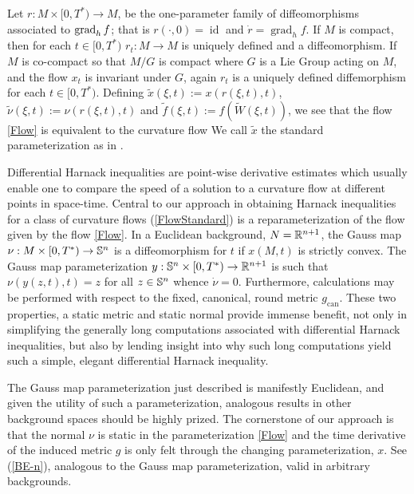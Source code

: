 Let \(r:M\times [0,T^{\ast})\to M\), be the one-parameter family of diffeomorphisms associated to $\grad_h f$; that is $r(\cdot,0)=\operatorname{id}$ and $\dot{r}=\operatorname{grad}_hf$. If $M$ is compact, then for each $t \in [0, T^{\ast})$ $r_t : M \to M$ is uniquely defined and a diffeomorphism. If $M$ is co-compact so that $M/G$ is compact where $G$ is a Lie Group acting on $M$, and the flow $x_t$ is invariant under $G$, again $r_t$ is a uniquely defined diffemorphism for each $t \in [0, T^{\ast})$. Defining $\tilde{x} (\xi, t) := x (r(\xi,t), t)$, $\tilde{\nu} (\xi, t) :=\nu (r(\xi,t), t)$ and $\tilde{f}(\xi,t):=f(\tilde{W} (\xi, t))$, we see that the flow \eqref{Flow} is equivalent to the curvature flow
\eq{\label{FlowStandard}
\tilde{x}&:M\times [0,T^{\ast})\to N\\
\dot{\tilde{x}} &= -\s \tilde{f} \tilde{\nu}.}
We call $\tilde{x}$ the standard parameterization as in \cite{Andrews:09/1994}.

Differential Harnack inequalities are point-wise derivative estimates which usually enable one to compare the speed of a solution to a curvature flow at different points in space-time.
Central to our approach in obtaining Harnack inequalities for a class of curvature flows (\ref{FlowStandard}) is a reparameterization of the flow given by the flow \eqref{Flow}.
In a Euclidean background, $N = \R^{n+1}$, the Gauss map $\nu: M\times [0,T^{\ast}) \to \S^n$ is a diffeomorphism for $t$ if $x(M,t)$ is strictly convex. The Gauss map parameterization $y: \S^n\times [0,T^{\ast}) \to \R^{n+1}$ \cite{Andrews:09/1994} is such that $\nu(y(z,t),t) = z$ for all $z \in \S^n$ whence $\dot{\nu} = 0$. Furthermore, calculations may be performed with respect to the fixed, canonical, round metric $g_{\operatorname{can}}$. These two properties, a static metric and static normal provide immense benefit, not only in simplifying the generally long computations associated with differential Harnack inequalities, but also by lending insight into why such long computations yield such a simple, elegant differential Harnack inequality.

The Gauss map parameterization just described is manifestly Euclidean, and given the utility of such a parameterization, analogous results in other background spaces should be highly prized. The cornerstone of our approach is that the normal \(\nu\) is static in the parameterization \eqref{Flow} and the time derivative of the induced metric \(g\) is only felt through the changing parameterization, $x$. See (\ref{BE-n}), analogous to the Gauss map parameterization, valid in arbitrary backgrounds.

